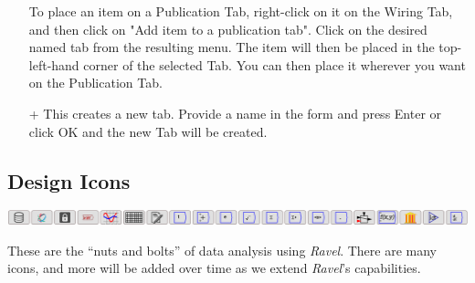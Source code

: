 \begin{itemize}
To place an item on a Publication Tab, right-click on it on the Wiring
Tab, and then click on "Add item to a publication tab". Click on
the desired named tab from the resulting menu. The item will then
be placed in the top-left-hand corner of the selected Tab. You can
then place it wherever you want on the Publication Tab.
\item[+] This creates a new tab. Provide a name in the form and press Enter
or click OK and the new Tab will be created. 
\end{itemize}

\subsection{Design Icons}

\includegraphics{images/DesignIcons}

These are the ``nuts and bolts'' of data analysis using \emph{Ravel}.
There are many icons, and more will be added over time as we extend
\emph{Ravel}'s capabilities.

